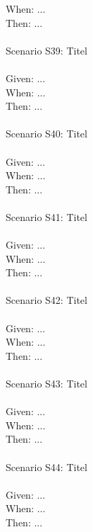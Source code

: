 \begin{tabbing}
    When:   \> \> \> ...\\
    Then:   \> \> \> ...\\
    \\
    Scenario S39: \> \> \> Titel \\ \\
    Given:  \> \> \> ...\\
    When:   \> \> \> ...\\
    Then:   \> \> \> ...\\
    \\
    Scenario S40: \> \> \> Titel \\ \\
    Given:  \> \> \> ...\\
    When:   \> \> \> ...\\
    Then:   \> \> \> ...\\
    \\
    Scenario S41: \> \> \> Titel \\ \\
    Given:  \> \> \> ...\\
    When:   \> \> \> ...\\
    Then:   \> \> \> ...\\
    \\
    Scenario S42: \> \> \> Titel \\ \\
    Given:  \> \> \> ...\\
    When:   \> \> \> ...\\
    Then:   \> \> \> ...\\
    \\
    Scenario S43: \> \> \> Titel \\ \\
    Given:  \> \> \> ...\\
    When:   \> \> \> ...\\
    Then:   \> \> \> ...\\
    \\
    Scenario S44: \> \> \> Titel \\ \\
    Given:  \> \> \> ...\\
    When:   \> \> \> ...\\
    Then:   \> \> \> ...\\
    \\
\end{tabbing}
\clearpage
